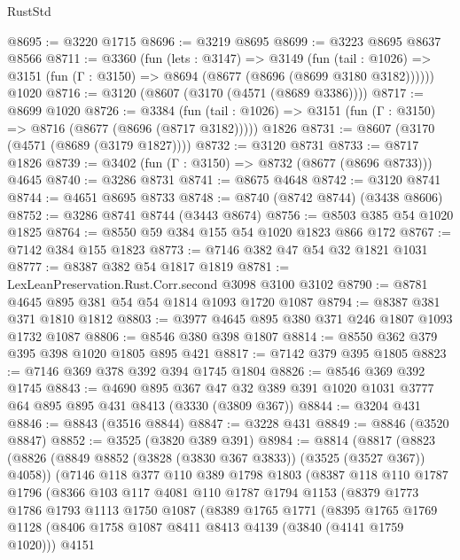 \begin{lexlean}{RustStd}
\begin{coremodule}
@8695 := @3220 @1715
@8696 := @3219 @8695
@8699 := @3223 @8695 @8637 @8566
@8711 := @3360
    (fun (lets : @3147) =>
    @3149
      (fun (tail : @1026) => @3151 (fun (Γ : @3150) => @8694 (@8677 (@8696 (@8699 @3180 @3182))))))
    @1020
@8716 := @3120 (@8607 (@3170 (@4571 (@8689 @3386))))
@8717 := @8699 @1020
@8726 := @3384
    (fun (tail : @1026) => @3151 (fun (Γ : @3150) => @8716 (@8677 (@8696 (@8717 @3182)))))
    @1826
@8731 := @8607 (@3170 (@4571 (@8689 (@3179 @1827))))
@8732 := @3120 @8731
@8733 := @8717 @1826
@8739 := @3402 (fun (Γ : @3150) => @8732 (@8677 (@8696 @8733))) @4645
@8740 := @3286 @8731
@8741 := @8675 @4648
@8742 := @3120 @8741
@8744 := @4651 @8695 @8733
@8748 := @8740 (@8742 @8744) (@3438 @8606)
@8752 := @3286 @8741 @8744 (@3443 @8674)
@8756 := @8503 @385 @54 @1020 @1825
@8764 := @8550 @59 @384 @155 @54 @1020 @1823 @866 @172
@8767 := @7142 @384 @155 @1823
@8773 := @7146 @382 @47 @54 @32 @1821 @1031
@8777 := @8387 @382 @54 @1817 @1819
@8781 := LexLeanPreservation.Rust.Corr.second @3098 @3100 @3102
@8790 := @8781 @4645 @895 @381 @54 @54 @1814 @1093 @1720 @1087
@8794 := @8387 @381 @371 @1810 @1812
@8803 := @3977 @4645 @895 @380 @371 @246 @1807 @1093 @1732 @1087
@8806 := @8546 @380 @398 @1807
@8814 := @8550 @362 @379 @395 @398 @1020 @1805 @895 @421
@8817 := @7142 @379 @395 @1805
@8823 := @7146 @369 @378 @392 @394 @1745 @1804
@8826 := @8546 @369 @392 @1745
@8843 := @4690
    @895
    @367
    @47
    @32
    @389
    @391
    @1020
    @1031
    @3777
    @64
    @895
    @895
    @431
    @8413
    (@3330 (@3809 @367))
@8844 := @3204 @431
@8846 := @8843 (@3516 @8844)
@8847 := @3228 @431
@8849 := @8846 (@3520 @8847)
@8852 := @3525 (@3820 @389 @391)
@8984 := @8814
    (@8817
      (@8823
        (@8826 (@8849 @8852 (@3828 (@3830 @367 @3833)) (@3525 (@3527 @367)) @4058))
        (@7146
          @118
          @377
          @110
          @389
          @1798
          @1803
          (@8387
            @118
            @110
            @1787
            @1796
            (@8366
              @103
              @117
              @4081
              @110
              @1787
              @1794
              @1153
              (@8379
                @1773
                @1786
                @1793
                @1113
                @1750
                @1087
                (@8389
                  @1765
                  @1771
                  (@8395
                    @1765
                    @1769
                    @1128
                    (@8406 @1758 @1087 @8411 @8413 @4139 (@3840 (@4141 @1759 @1020)))
                    @4151

\end{coremodule}
\end{lexlean}
